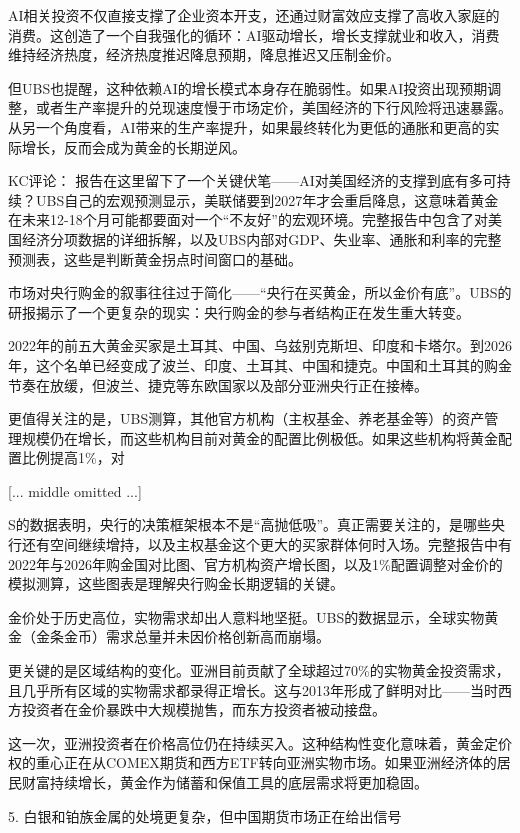 \documentclass[11pt]{ctexart}
\begin{document}
AI相关投资不仅直接支撑了企业资本开支，还通过财富效应支撑了高收入家庭的消费。这创造了一个自我强化的循环：AI驱动增长，增长支撑就业和收入，消费维持经济热度，经济热度推迟降息预期，降息推迟又压制金价。

但UBS也提醒，这种依赖AI的增长模式本身存在脆弱性。如果AI投资出现预期调整，或者生产率提升的兑现速度慢于市场定价，美国经济的下行风险将迅速暴露。从另一个角度看，AI带来的生产率提升，如果最终转化为更低的通胀和更高的实际增长，反而会成为黄金的长期逆风。

KC评论： 报告在这里留下了一个关键伏笔——AI对美国经济的支撑到底有多可持续？UBS自己的宏观预测显示，美联储要到2027年才会重启降息，这意味着黄金在未来12-18个月可能都要面对一个“不友好”的宏观环境。完整报告中包含了对美国经济分项数据的详细拆解，以及UBS内部对GDP、失业率、通胀和利率的完整预测表，这些是判断黄金拐点时间窗口的基础。

市场对央行购金的叙事往往过于简化——“央行在买黄金，所以金价有底”。UBS的研报揭示了一个更复杂的现实：央行购金的参与者结构正在发生重大转变。

2022年的前五大黄金买家是土耳其、中国、乌兹别克斯坦、印度和卡塔尔。到2026年，这个名单已经变成了波兰、印度、土耳其、中国和捷克。中国和土耳其的购金节奏在放缓，但波兰、捷克等东欧国家以及部分亚洲央行正在接棒。

更值得关注的是，UBS测算，其他官方机构（主权基金、养老基金等）的资产管理规模仍在增长，而这些机构目前对黄金的配置比例极低。如果这些机构将黄金配置比例提高1\%，对

[... middle omitted ...]

S的数据表明，央行的决策框架根本不是“高抛低吸”。真正需要关注的，是哪些央行还有空间继续增持，以及主权基金这个更大的买家群体何时入场。完整报告中有2022年与2026年购金国对比图、官方机构资产增长图，以及1\%配置调整对金价的模拟测算，这些图表是理解央行购金长期逻辑的关键。

金价处于历史高位，实物需求却出人意料地坚挺。UBS的数据显示，全球实物黄金（金条金币）需求总量并未因价格创新高而崩塌。

更关键的是区域结构的变化。亚洲目前贡献了全球超过70\%的实物黄金投资需求，且几乎所有区域的实物需求都录得正增长。这与2013年形成了鲜明对比——当时西方投资者在金价暴跌中大规模抛售，而东方投资者被动接盘。

这一次，亚洲投资者在价格高位仍在持续买入。这种结构性变化意味着，黄金定价权的重心正在从COMEX期货和西方ETF转向亚洲实物市场。如果亚洲经济体的居民财富持续增长，黄金作为储蓄和保值工具的底层需求将更加稳固。

5. 白银和铂族金属的处境更复杂，但中国期货市场正在给出信号
\end{document}
